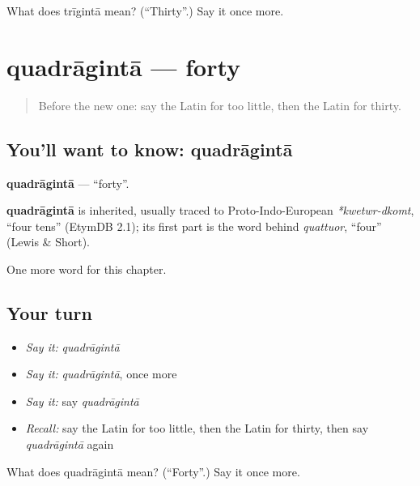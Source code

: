 \begin{tcolorbox}[breakable,colback=teal!4,colframe=teal!35!black,title={Before you move on}]
What does trīgintā mean? (\textquotedblleft{}Thirty\textquotedblright{}.) Say it once more.
\end{tcolorbox}
\section[quadrāgintā]{quadrāgintā — forty}

\label{lesson:LA-C106-quadraginta}



\begin{quote}
Before the new one: say the Latin for too little, then the Latin for thirty.
\end{quote}

\subsection*{You'll want to know: quadrāgintā}
\textbf{quadrāgintā} — \textquotedblleft{}forty\textquotedblright{}.

\begin{cousinweb}
\textbf{quadrāgintā} is inherited, usually traced to Proto-Indo-European \emph{*kwetwr-dkomt}, \textquotedblleft{}four tens\textquotedblright{} (EtymDB 2.1); its first part is the word behind \emph{quattuor}, \textquotedblleft{}four\textquotedblright{} (Lewis \& Short).
\end{cousinweb}

\begin{grammarlens}[title={What you've built}]
One more word for this chapter.
\end{grammarlens}

\subsection*{Your turn}
\begin{itemize}
\raggedright
  \item \emph{Say it:} \emph{quadrāgintā}
  \item \emph{Say it:} \emph{quadrāgintā}, once more
  \item \emph{Say it:} say \emph{quadrāgintā}
  \item \emph{Recall:} say the Latin for too little, then the Latin for thirty, then say \emph{quadrāgintā} again
\end{itemize}

\begin{tcolorbox}[breakable,colback=teal!4,colframe=teal!35!black,title={Before you move on}]
What does quadrāgintā mean? (\textquotedblleft{}Forty\textquotedblright{}.) Say it once more.
\end{tcolorbox}
